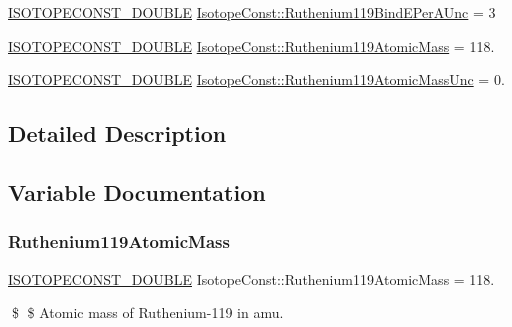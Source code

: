 \begin{DoxyCompactItemize}
\mbox{\hyperlink{group___isotope_const-_macros_ga8f45a7272ce02c0b4c65c44636ed719a}{I\+S\+O\+T\+O\+P\+E\+C\+O\+N\+S\+T\+\_\+\+D\+O\+U\+B\+LE}} \mbox{\hyperlink{group___isotope_const-_ruthenium-_ru119_ga3652ac0c55451bceb231a13fefc3c998}{Isotope\+Const\+::\+Ruthenium119\+Bind\+E\+Per\+A\+Unc}} = 3
\item 
\mbox{\hyperlink{group___isotope_const-_macros_ga8f45a7272ce02c0b4c65c44636ed719a}{I\+S\+O\+T\+O\+P\+E\+C\+O\+N\+S\+T\+\_\+\+D\+O\+U\+B\+LE}} \mbox{\hyperlink{group___isotope_const-_ruthenium-_ru119_gaf9237df9197cbadd8fdfcd5b2c2f4b13}{Isotope\+Const\+::\+Ruthenium119\+Atomic\+Mass}} = 118.
\item 
\mbox{\hyperlink{group___isotope_const-_macros_ga8f45a7272ce02c0b4c65c44636ed719a}{I\+S\+O\+T\+O\+P\+E\+C\+O\+N\+S\+T\+\_\+\+D\+O\+U\+B\+LE}} \mbox{\hyperlink{group___isotope_const-_ruthenium-_ru119_gab5c7ee9dec84ef881b9d1c50c8fe659c}{Isotope\+Const\+::\+Ruthenium119\+Atomic\+Mass\+Unc}} = 0.
\end{DoxyCompactItemize}


\subsection{Detailed Description}


\subsection{Variable Documentation}
\mbox{\label{group___isotope_const-_ruthenium-_ru119_gaf9237df9197cbadd8fdfcd5b2c2f4b13}} 
\subsubsection{\texorpdfstring{Ruthenium119\+Atomic\+Mass}{Ruthenium119AtomicMass}}
{\footnotesize\ttfamily \mbox{\hyperlink{group___isotope_const-_macros_ga8f45a7272ce02c0b4c65c44636ed719a}{I\+S\+O\+T\+O\+P\+E\+C\+O\+N\+S\+T\+\_\+\+D\+O\+U\+B\+LE}} Isotope\+Const\+::\+Ruthenium119\+Atomic\+Mass = 118.}

\$ \$ Atomic mass of Ruthenium-\/119 in amu. \mbox{\label{group___isotope_const-_ruthenium-_ru119_gab5c7ee9dec84ef881b9d1c50c8fe659c}} 
